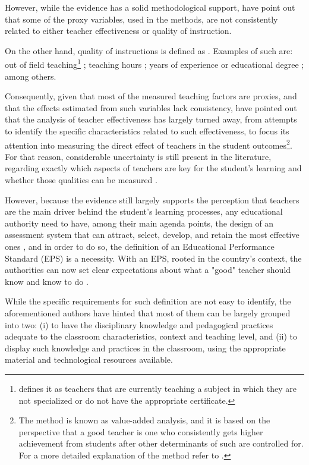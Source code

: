 However, while the evidence has a solid methodological support, \citet{Hanushek_et_al_2006} have point out that some of the proxy variables, used in the methods, are not consistently related to either teacher effectiveness or quality of instruction. 
%

On the other hand, quality of instructions is defined as . Examples of such are: out of field teaching\footnote{\citet{Medeiros_et_al_2018} defines it as teachers that are currently teaching a subject in which they are not specialized or do not have the appropriate certificate.} \cite{Ingersoll_1998, Dee_et_al_2008, Bertoni_et_al_2020a}; teaching hours \cite{Bruns_et_al_2015}; years of experience or educational degree \cite{Rockoff_2004, Rivkin_et_al_2005, Clotfelter_et_al_2006, Clotfelter_et_al_2007, Hanushek_et_al_2012}; among others.

Consequently, given that most of the measured teaching factors are proxies, and that the effects estimated from such variables lack consistency, \citet{Hanushek_et_al_2012} have pointed out that the analysis of teacher effectiveness has largely turned away, from attempts to identify the specific characteristics related to such effectiveness, to focus its attention into measuring the direct effect of teachers in the student outcomes\footnote{The method is known as value-added analysis, and it is based on the perspective that a good teacher is one who consistently gets higher achievement from students after other determinants of such are controlled for. For a more detailed explanation of the method refer to \citet{Scherrer_2011}.}. For that reason, considerable uncertainty is still present in the literature, regarding exactly which aspects of teachers are key for the student's learning and whether those qualities can be measured \cite{Rockoff_2004, Clotfelter_et_al_2006}.

However, because the evidence still largely supports the perception that teachers are the main driver behind the student's learning processes, any educational authority need to have, among their main agenda points, the design of an assessment system that can attract, select, develop, and retain the most effective ones \cite{Elacqua_et_al_2018}, and in order to do so, the definition of an Educational Performance Standard (EPS) is a necessity. With an EPS, rooted in the country's context, the authorities can now set clear expectations about what a "good" teacher should know and know to do \cite{Hincapie_et_al_2020}. 

While the specific requirements for such definition are not easy to identify, the aforementioned authors have hinted that most of them can be largely grouped into two: (i) to have the disciplinary knowledge and pedagogical practices adequate to the classroom characteristics, context and teaching level, and (ii) to display such knowledge and practices in the classroom, using the appropriate material and technological resources available. 

